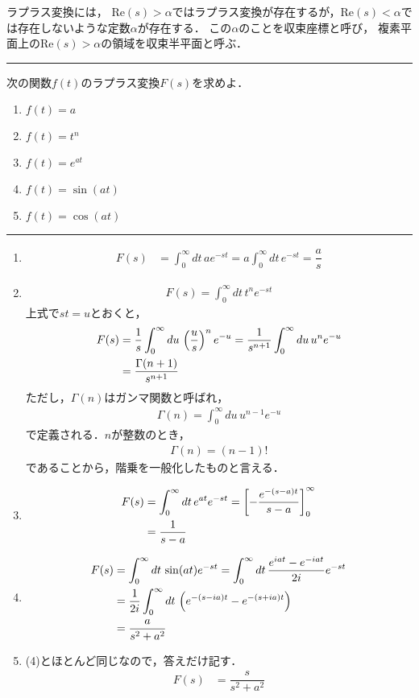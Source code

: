 ラプラス変換には，
$\mathrm{Re}(s)>\alpha$ではラプラス変換が存在するが，$\mathrm{Re}(s)<\alpha$では存在しないような定数$\alpha$が存在する．
この$\alpha$のことを収束座標と呼び，
複素平面上の$\mathrm{Re}(s)>\alpha$の領域を収束半平面と呼ぶ．
%
\newpage
%
\hrule
\reidai
次の関数$f(t)$のラプラス変換$F(s)$を求めよ．
\begin{enumerate}[(1)]
  \item $f(t)=a$
  \item $f(t)=t^n$
  \item $f(t)=e^{at}$
  \item $f(t)=\sin(at)$
  \item $f(t)=\cos(at)$ 
\end{enumerate}
\hrule
\begin{enumerate}[(1)]
\item  
\begin{align}
  F(s) & = \int_{0}^{\infty}dt\,ae^{-st} = a\int_{0}^{\infty}dt\,e^{-st}
         = \dfrac{a}{s} 
\end{align}
\item
\begin{align}
  F(s) = \int_{0}^{\infty}dt\,t^n e^{-st} 
\end{align}
上式で$st=u$とおくと，
\begin{align}
  F(s) &= \dfrac{1}{s}\int_{0}^{\infty}du\,\left(\dfrac{u}{s}\right)^{n}e^{-u}
        = \dfrac{1}{s^{n+1}}\int_{0}^{\infty}du\,u^n e^{-u} \notag \\
       &= \dfrac{\Gamma(n+1)}{s^{n+1}} 
\end{align}
ただし，$\Gamma(n)$はガンマ関数と呼ばれ，
\begin{align}
  \Gamma(n) = \int_{0}^{\infty}du\, u^{n-1}e^{-u} 
\end{align}
で定義される．$n$が整数のとき，
\begin{align}
  \Gamma(n) = (n-1)! 
\end{align}
であることから，階乗を一般化したものと言える．
\item
\begin{align}
  F(s) &= \int_{0}^{\infty}dt\,e^{at}e^{-st} = \left[ - \dfrac{e^{-(s-a)t}}{s-a} \right]_{0}^{\infty} \notag \\
       &= \dfrac{1}{s-a}
\end{align}
\item
\begin{align}
  F(s) &= \int_{0}^{\infty}dt\,\sin(at)e^{-st} = \int_{0}^{\infty}dt\,\dfrac{e^{iat}-e^{-iat}}{2i}e^{-st} \notag \\
       &= \dfrac{1}{2i}\int_{0}^{\infty}dt\,\left(e^{-(s-ia)t}-e^{-(s+ia)t}\right) \notag \\
       &= \dfrac{a}{s^{2}+a^{2}}
\end{align}
\item (4)とほとんど同じなので，答えだけ記す．
\begin{align}
  F(s) &= \dfrac{s}{s^{2}+a^{2}} 
\end{align}
\end{enumerate}
\newpage
%
